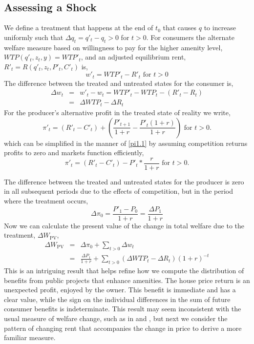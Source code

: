 \documentclass[ecta,nameyear,draft]{econsocart}
\theoremstyle{plain}
\theoremstyle{remark}
\begin{document}
\subsection{Assessing a Shock}
We define a treatment that happens at the end of $t_0$ that causes $q$ to increase uniformly such that $\Delta q_t=q'_t-q_t>0$ for $t>0$.
For consumers the alternate welfare measure based on willingness to pay for the higher amenity level,$\mathit{WTP}(q'_t,z_t,y)=\mathit{WTP'}_t$, and an adjusted equilibrium rent, $R'_t=R(q'_t,z_t,P'_t,C'_t)$ is,
\begin{equation*}
	w'_t=\mathit{WTP'}_t-R'_t \text{ for } t>0
\end{equation*}
The difference between the treated and untreated states for the consumer is,
\begin{eqnarray}
	\Delta w_t&=&w'_t-w_t=WTP'_t-WTP_t-(R'_t-R_t)\\
	&=&\Delta\mathit{WTP}_t-\Delta R_t
\end{eqnarray}
For the producer’s alternative profit in the treated state of reality we write,
\begin{equation*}
	\pi'_t = (R'_t-C'_t)+\left(\frac{P'_{t+1}}{1+r}-\frac{P'_t(1+r)}{1+r}\right)\text{ for } t>0.
\end{equation*}
which can be simplified in the manner of \ref{pi1.1} by assuming competition returns profits to zero and markets function efficiently,
\begin{equation}
\pi'_t = (R'_t-C'_t)-P'_t*\frac{r}{1+r}\text{ for } t>0.\label{pi2}
\end{equation}

The difference between the treated and untreated states for the producer is zero in all subsequent periods due to the effects of competition, but in the period where the treatment occurs,
\begin{equation}
	\Delta\pi_0=\frac{P'_1-P_0}{1+r}=\frac{\Delta P_1}{1+r}
\end{equation}
Now we can calculate the present value of the change in total welfare due to the treatment, $\Delta W_{\mathrm{PV}}$,
\begin{eqnarray}
	\Delta W_{\mathrm{PV}}&=&\Delta \pi_0+\sum_{t>0}\Delta w_t\nonumber\\
	&=&\frac{\Delta P_1}{1+r}+\sum_{t>0} (\Delta \mathit{WTP}_t-\Delta R_t)(1+r)^{-t} \label{deltaW1}
\end{eqnarray}
This is an intriguing result that helps refine how we compute the distribution of benefits from public projects that enhance amenities. The house price return is an unexpected profit, enjoyed by the owner. This benefit is immediate and has a clear value, while the sign on the individual differences in the sum of future consumer benefits is indeterminate. This result may seem inconsistent with the usual measure of welfare change, such as in \cite{freeman14} and \cite{banzhaf20}, but next we consider the pattern of changing rent that accompanies the change in price to derive a more familiar measure. 
\end{document}

